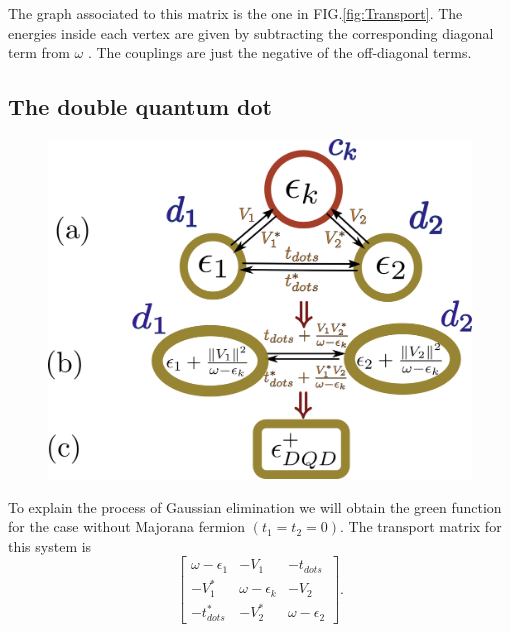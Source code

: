 \documentclass[showpacs,aps,prb,reprint,superscriptaddress]{revtex4-1}
\begin{document}
The graph associated to this matrix is the one in FIG.\ref{fig:Transport}. The energies inside each vertex are given by subtracting the corresponding diagonal term from $\omega$ . The couplings are just the negative of the off-diagonal terms. 

\subsection{The double quantum dot}


        \begin{figure}[t]
        \begin{center}
        \includegraphics[scale=0.25]{Graficos/Graph_DQD-Pro.png}
        \caption{ 
        }
        \label{fig:GraphsDQD}
        \end{center}
        \end{figure}




To explain the process of Gaussian elimination we will obtain the green function for the case without Majorana fermion $(t_1= t_2=0)$.  The transport matrix for this system is 
\begin{equation}
        \left[\begin{array}{ccc}
    \omega-\epsilon_{1} & -V_{1} & -t_{dots}\\
    -V_{1}^{*} & \omega-\epsilon_{k} & -V_{2}\\
    -t_{dots}^{*} & -V_{2}^{*} & \omega-\epsilon_{2}
    \end{array}\right]. \label{eq:DQDMatrix}
\end{equation}
\end{document}
